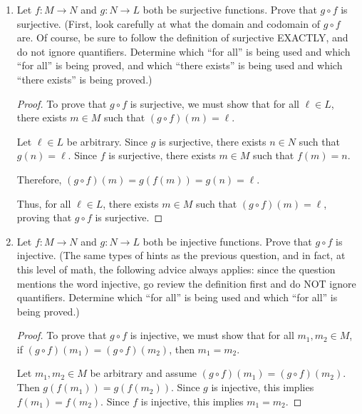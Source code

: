 \documentclass{article}
\begin{document}
\begin{enumerate}

    \item Let $f : M \to N$ and $g: N \to L$ both be surjective functions. Prove that $g
              \circ f$ is surjective. (First, look carefully at what the domain and codomain
          of $g \circ f$ are. Of course, be sure to follow the definition of surjective
          EXACTLY, and do not ignore quantifiers. Determine which ``for all'' is being
          used and which ``for all'' is being proved, and which ``there exists'' is being
          used and which ``there exists'' is being proved.)

          \begin{proof}
              To prove that $g \circ f$ is surjective, we must show that for all $\ell \in L$, there exists $m \in M$ such that $(g \circ f)(m) = \ell$.

              Let $\ell \in L$ be arbitrary. Since $g$ is surjective, there exists $n \in N$
              such that $g(n) = \ell$. Since $f$ is surjective, there exists $m \in M$ such
              that $f(m) = n$.

              Therefore, $(g \circ f)(m) = g(f(m)) = g(n) = \ell$.

              Thus, for all $\ell \in L$, there exists $m \in M$ such that $(g \circ f)(m) =
                  \ell$, proving that $g \circ f$ is surjective.
          \end{proof}

          \newpage

    \item Let $f : M \to N$ and $g: N \to L$ both be injective functions. Prove that $g
              \circ f$ is injective. (The same types of hints as the previous question, and
          in fact, at this level of math, the following advice always applies: since the
          question mentions the word injective, go review the definition first and do NOT
          ignore quantifiers. Determine which ``for all'' is being used and which ``for
          all'' is being proved.)

          \begin{proof}
              To prove that $g \circ f$ is injective, we must show that for all $m_1, m_2 \in M$, if $(g \circ f)(m_1) = (g \circ f)(m_2)$, then $m_1 = m_2$.

              Let $m_1, m_2 \in M$ be arbitrary and assume $(g \circ f)(m_1) = (g \circ
                  f)(m_2)$. Then $g(f(m_1)) = g(f(m_2))$. Since $g$ is injective, this implies
              $f(m_1) = f(m_2)$. Since $f$ is injective, this implies $m_1 = m_2$.


\end{proof}
\end{enumerate}
\end{document}
